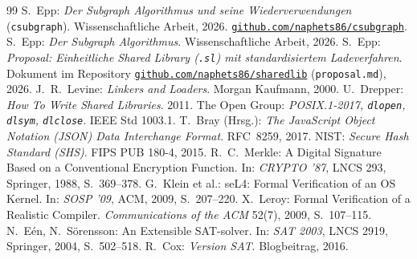 \documentclass[a4paper,12pt,twoside]{report}
\DeclareRobustCommand{\_}{\ifmmode\mbox{\textunderscore}\else\textunderscore\allowbreak{}\fi}
\theoremstyle{definition}
\newcommand{\repo}[1]{\href{https://github.com/naphets86/#1}{\nolinkurl{github.com/naphets86/#1}}}
\begin{document}
\begin{thebibliography}{99}
 S.~Epp: \emph{Der Subgraph Algorithmus und seine Wiederverwendungen} (\texttt{csubgraph}). Wissenschaftliche Arbeit, 2026. \repo{csubgraph}.
 S.~Epp: \emph{Der Subgraph Algorithmus}. Wissenschaftliche Arbeit, 2026.
 S.~Epp: \emph{Proposal: Einheitliche Shared Library (\texttt{.sl}) mit standardisiertem Ladeverfahren}. Dokument im Repository \repo{sharedlib} (\texttt{proposal.md}), 2026.
 J.~R.~Levine: \emph{Linkers and Loaders}. Morgan Kaufmann, 2000.
 U.~Drepper: \emph{How To Write Shared Libraries}. 2011.
 The Open Group: \emph{POSIX.1-2017, \texttt{dlopen}, \texttt{dlsym}, \texttt{dlclose}}. IEEE Std 1003.1.
 T.~Bray (Hrsg.): \emph{The JavaScript Object Notation (JSON) Data Interchange Format}. RFC~8259, 2017.
 NIST: \emph{Secure Hash Standard (SHS)}. FIPS PUB 180-4, 2015.
 R.~C.~Merkle: A Digital Signature Based on a Conventional Encryption Function. In: \emph{CRYPTO '87}, LNCS 293, Springer, 1988, S.~369--378.
 G.~Klein et al.: seL4: Formal Verification of an OS Kernel. In: \emph{SOSP '09}, ACM, 2009, S.~207--220.
 X.~Leroy: Formal Verification of a Realistic Compiler. \emph{Communications of the ACM} 52(7), 2009, S.~107--115.
 N.~E{\'e}n, N.~S{\"o}rensson: An Extensible SAT-solver. In: \emph{SAT 2003}, LNCS 2919, Springer, 2004, S.~502--518.
 R.~Cox: \emph{Version SAT}. Blogbeitrag, 2016.
\end{thebibliography}
\end{document}
